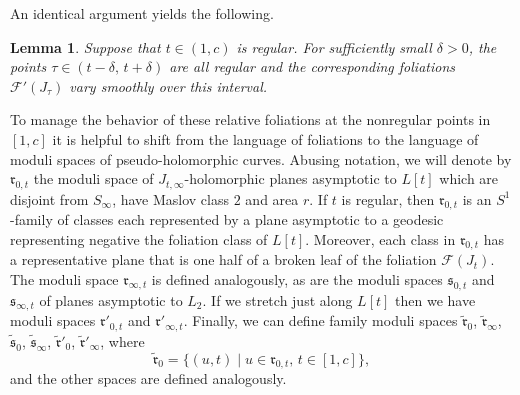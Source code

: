 \documentclass[12pt]{amsart}
\newtheorem{lemma}[theorem]{Lemma}
\theoremstyle{definition}
\begin{document}
An identical argument yields the following. 

\begin{lemma}\label{lem:fam'}
Suppose that $t \in (1,c)$ is regular. For sufficiently small $\delta>0$,  the points $\tau \in (t - \delta, \, t+\delta)$ are all regular and the corresponding foliations $\mathcal{F}'(J_\tau)$ vary smoothly over this interval. 
\end{lemma}


To manage the behavior of these relative foliations at the  nonregular points in $[1,c]$ it is helpful to shift from the language of foliations to the language of moduli spaces of pseudo-holomorphic curves. Abusing notation, we will denote by $\mathfrak{r}_{0,t}$ the moduli space of $J_{t, \infty}$-holomorphic planes asymptotic to $L[t]$ which are disjoint from $S_{\infty}$, have Maslov class $2$ and area $r$. If $t$ is regular,  then $\mathfrak{r}_{0,t}$ is an $S^1$-family of classes each represented by a plane asymptotic to a geodesic representing negative the foliation class of $L[t]$. Moreover, each class in $\mathfrak{r}_{0,t}$ has a representative plane that is one half of a broken leaf of the foliation $\mathcal{F}(J_t)$. 
% 
The moduli space 
$\mathfrak{r}_{\infty,t}$ is defined analogously, as are the moduli spaces $\mathfrak{s}_{0,t}$ and $\mathfrak{s}_{\infty,t}$ of planes asymptotic to $L_2$. If we stretch just along $L[t]$ then we have moduli spaces $\mathfrak{r}'_{0,t}$ and $\mathfrak{r}'_{\infty,t}$. Finally, we can define family moduli spaces $\tilde {\mathfrak{r}}_0$, $\tilde {\mathfrak{r}}_{\infty}$, $\tilde {\mathfrak{s}}_0$, $\tilde {\mathfrak{s}}_{\infty}$, $\tilde {\mathfrak{r}}'_0$, $\tilde {\mathfrak{r}}'_{\infty}$, where
$$\tilde {\mathfrak{r}}_0= \{(u,t) \mid u \in \mathfrak{r}_{0,t},\, t\in [1,c]\},$$
and the other spaces are defined analogously.
\end{document}
